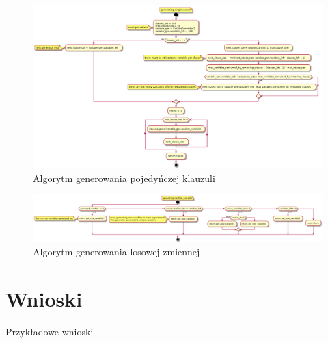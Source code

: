 \documentclass[a4paper,12pt]{article}
\begin{document}
\begin{figure}[H]
  \centering
  \includegraphics[width=\textwidth]{logic-formula-generator/clause_generator.png}
  \caption{Algorytm generowania pojedyńczej klauzuli}
\end{figure}

\begin{figure}[H]
  \centering
  \includegraphics[width=\textwidth]{logic-formula-generator/variable_generator.png}
  \caption{Algorytm generowania losowej zmiennej}
\end{figure}

\section{Wnioski}

Przykładowe wnioski

\printglossary
\end{document}
